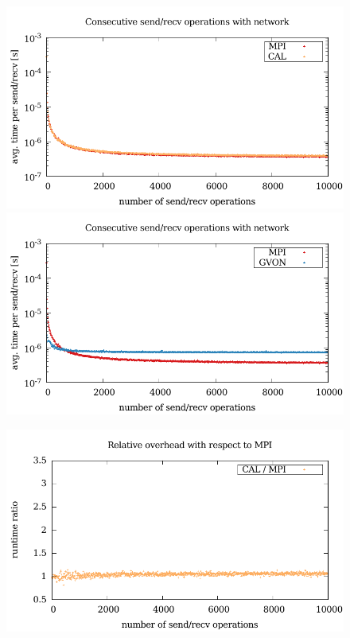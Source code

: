 \begin{figure}[H]
  \begin{minipage}[t]{0.5\textwidth}
    \includegraphics[width=\textwidth]{plots/50_nsend_network_cal_kepler}
    \includegraphics[width=\textwidth]{plots/50_nsend_network_gvon_kepler}
  \end{minipage}%
  \begin{minipage}[t]{0.5\textwidth}
    \includegraphics[width=\textwidth]{plots/50_nsend_network_overhead_cal_kepler}

\end{minipage}
\end{figure}

